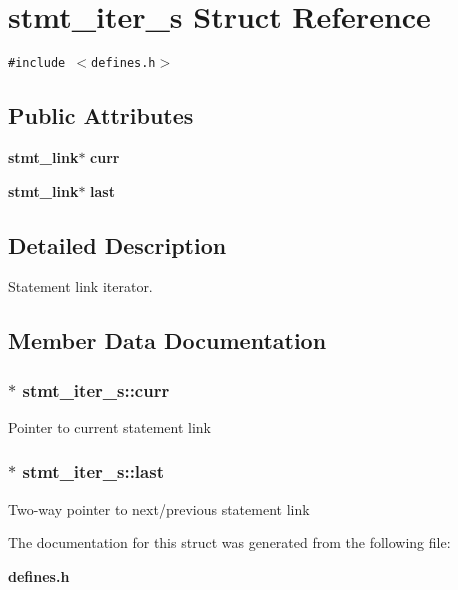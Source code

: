 \section{stmt\_\-iter\_\-s  Struct Reference}
\label{structstmt__iter__s}
{\tt \#include $<$defines.h$>$}

\subsection*{Public Attributes}
\begin{CompactItemize}
\item 
{\bf stmt\_\-link}$\ast$ {\bf curr}
\item 
{\bf stmt\_\-link}$\ast$ {\bf last}
\end{CompactItemize}


\subsection{Detailed Description}
Statement link iterator. 



\subsection{Member Data Documentation}
\subsubsection{ $\ast$ stmt\_\-iter\_\-s::curr}\label{structstmt__iter__s_m0}


Pointer to current statement link 
\subsubsection{ $\ast$ stmt\_\-iter\_\-s::last}\label{structstmt__iter__s_m1}


Two-way pointer to next/previous statement link 

The documentation for this struct was generated from the following file:\begin{CompactItemize}
\item 
{\bf defines.h}\end{CompactItemize}
